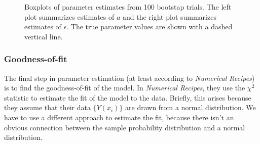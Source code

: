 \documentclass{article}
\begin{document}
\begin{figure}
  \centering
  \begin{subfigure}{0.48\textwidth}
  \end{subfigure}
  \hfill
  \begin{subfigure}{0.48\textwidth}
  \end{subfigure}
  \caption[Boxplots of bootstap trials]{Boxplots of parameter
    estimates from 100 bootstap trials. The left plot summarizes estimates
    of $a$ and the right plot summarizes estimates of $\epsilon$. The
    true parameter values are shown with a dashed vertical
    line.} 
  \label{fig:bootstraps}
\end{figure}

\newpage

\subsubsection{Goodness-of-fit}
\label{sec:goodness-fit}

The final step in parameter estimation (at least according to
\textit{Numerical Recipes}) is to find the goodness-of-fit of the
model. In \textit{Numerical Recipes}, they use the $\chi^2$ statistic
to estimate the fit of the model to the data. Briefly, this arises
because they assume that their data $\{Y(x_i)\}$ are drawn from a
normal distribution. We have to use a different approach to estimate
the fit, because there isn't an obvious connection between the sample
probability distribution and a normal distribution.
\end{document}
